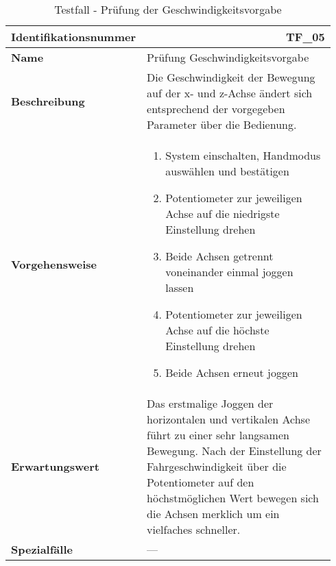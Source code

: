 \documentclass[../../../Bachelorarbeit.tex]{subfiles}
\begin{document}
\begin{table}[H]
    \centering
    \begin{tabular}{ p{0.34\linewidth}  p{0.6\linewidth} }
        \hline
        \textbf{Identifikationsnummer}  & \multicolumn{1}{r}{TF\_05} \\ \hline
        \textbf{Name}                   & Prüfung Geschwindigkeitsvorgabe \\
        \textbf{Beschreibung}           & Die Geschwindigkeit der Bewegung auf der x- und z-Achse ändert sich entsprechend der vorgegeben Parameter über die Bedienung. \\
        \textbf{Vorgehensweise}         &   {\begin{enumerate}[noitemsep,topsep=0pt,parsep=0pt,partopsep=0pt,leftmargin=*]
                                                \item System einschalten, Handmodus auswählen und bestätigen
                                                \item Potentiometer zur jeweiligen Achse auf die niedrigste Einstellung drehen
                                                \item Beide Achsen getrennt voneinander einmal joggen lassen
                                                \item Potentiometer zur jeweiligen Achse auf die höchste Einstellung drehen
                                                \item Beide Achsen erneut joggen
                                            \end{enumerate}} \\
        \textbf{Erwartungswert}         & Das erstmalige Joggen der horizontalen und vertikalen Achse führt zu einer sehr langsamen Bewegung. Nach der Einstellung der Fahrgeschwindigkeit über die Potentiometer auf den höchstmöglichen Wert bewegen sich die Achsen merklich um ein vielfaches schneller. \\
        \textbf{Spezialfälle}           & --- \\ \hline
    \end{tabular}
    \caption[\acs{tf} - Geschwindigkeitsvorgabe]{Testfall - Prüfung der Geschwindigkeitsvorgabe}
    \label{tab:my-table65}
\end{table}
\end{document}
